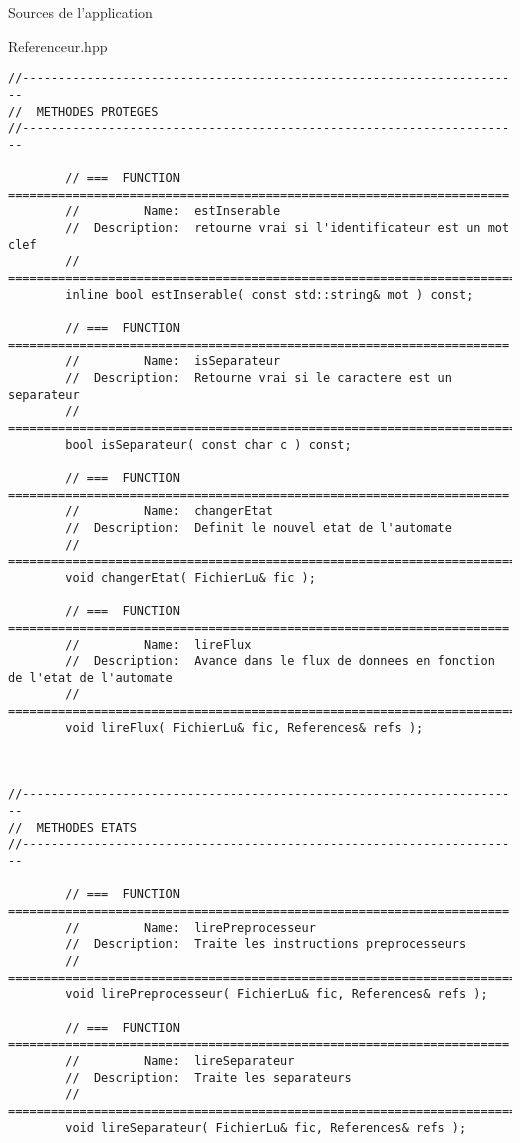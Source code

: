 \documentclass{article}
\begin{document}
\begin{section}{Sources de l'application}
\begin{paragraph}{Referenceur.hpp}
\begin{verbatim}
//----------------------------------------------------------------------
//  METHODES PROTEGES
//----------------------------------------------------------------------

        // ===  FUNCTION  ======================================================================
        //         Name:  estInserable
        //  Description:  retourne vrai si l'identificateur est un mot clef
        // =====================================================================================
        inline bool estInserable( const std::string& mot ) const;

        // ===  FUNCTION  ======================================================================
        //         Name:  isSeparateur
        //  Description:  Retourne vrai si le caractere est un separateur
        // =====================================================================================
        bool isSeparateur( const char c ) const;

        // ===  FUNCTION  ======================================================================
        //         Name:  changerEtat
        //  Description:  Definit le nouvel etat de l'automate
        // =====================================================================================
        void changerEtat( FichierLu& fic );

        // ===  FUNCTION  ======================================================================
        //         Name:  lireFlux
        //  Description:  Avance dans le flux de donnees en fonction de l'etat de l'automate
        // =====================================================================================
        void lireFlux( FichierLu& fic, References& refs );



//----------------------------------------------------------------------
//  METHODES ETATS
//----------------------------------------------------------------------

        // ===  FUNCTION  ======================================================================
        //         Name:  lirePreprocesseur
        //  Description:  Traite les instructions preprocesseurs
        // =====================================================================================
        void lirePreprocesseur( FichierLu& fic, References& refs );

        // ===  FUNCTION  ======================================================================
        //         Name:  lireSeparateur
        //  Description:  Traite les separateurs
        // =====================================================================================
        void lireSeparateur( FichierLu& fic, References& refs );


\end{verbatim}
\end{paragraph}
\end{section}
\end{document}
